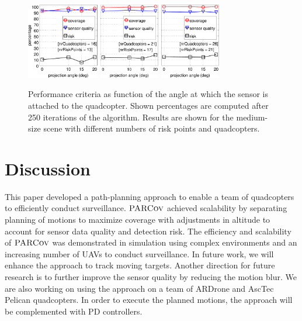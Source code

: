 \documentclass[letterpaper, 10pt, conference]{ieeeconf}
\newcommand{\Function}[1]{\ensuremath{{ \textsc{#1}}}}
\newcommand{\Name}{\Function{\small{PARCov}}}
\begin{document}
\begin{figure}
\centering
\includegraphics[height=1.3in]{usef/figResCameraR13Q16}
\includegraphics[height=1.3in]{usef/noy/figResCameraR17Q21}
\includegraphics[height=1.3in]{usef/noy/figResCameraR21Q26}
\caption{Performance criteria as function of the angle at which the
  sensor is attached to the quadcopter. Shown percentages
are computed after 250 iterations of the algorithm. Results are
shown for the medium-size scene with different numbers of risk points and
quadcopters.} \label{fig:ResCamera} 
\end{figure}



\section{Discussion}

This paper developed a path-planning approach to enable a team of
quadcopters to efficiently conduct surveillance. $\Name$
achieved scalability by separating planning of motions to maximize
coverage with adjustments in altitude to account for sensor data quality
and detection risk.  The efficiency and scalability of $\Name$ was
demonstrated in simulation using complex environments and an
increasing number of UAVs to conduct surveillance.  In future
work, we will enhance the approach to track moving targets. Another
direction for future research is to further improve the sensor quality
by reducing the motion blur. We are also working on using the approach
on a team of ARDrone and AscTec Pelican quadcopters. In order to
execute the planned motions, the approach will be complemented with PD
controllers.
\end{document}
